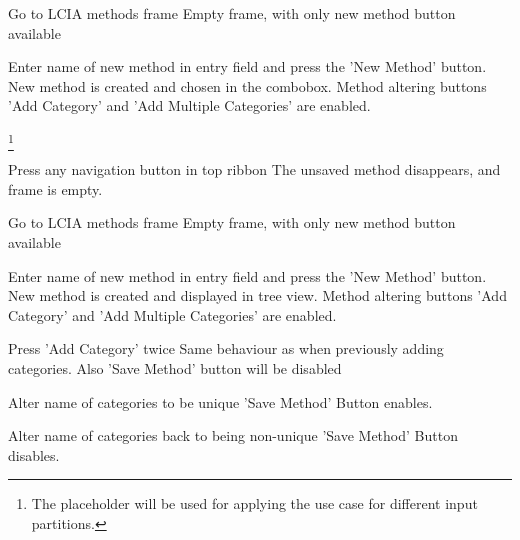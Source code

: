 

{
\step
{Go to LCIA methods frame}
{Empty frame, with only new method button available}

\step
{Enter name of new method in entry field and press the 'New Method' button.}
{New method is created and chosen in the combobox. Method altering buttons 'Add Category' and 'Add Multiple Categories' are enabled.}

\placeholder \footnote{The placeholder will be used for applying the use case for different input partitions.}

\step
{Press any navigation button in top ribbon}
{The unsaved method disappears, and frame is empty.}}





{
\step
{Go to LCIA methods frame}
{Empty frame, with only new method button available}

\step
{Enter name of new method in entry field and press the 'New Method' button.}
{New method is created and displayed in tree view. Method altering buttons 'Add Category' and 'Add Multiple Categories' are enabled.}

\step
{Press 'Add Category' twice}
{Same behaviour as when previously adding categories. Also 'Save Method' button will be disabled}

\step
{Alter name of categories to be unique}
{'Save Method' Button enables.}

\step
{Alter name of categories back to being non-unique}
{'Save Method' Button disables.}
}




